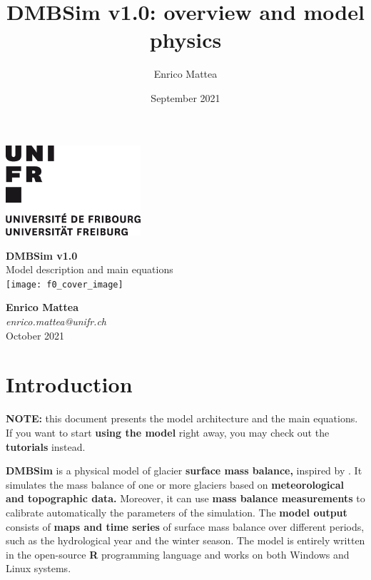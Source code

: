 \documentclass[15pt]{extarticle}
\title{DMBSim v1.0: overview and model physics}
\author{Enrico Mattea}
\date{September 2021}
\begin{document}

\begin{titlepage}
    \includegraphics[width=5cm]{unifr_logo}
    \par
    \vspace{2.0cm}
	\centering
	{\huge\textbf{DMBSim v1.0\\}}
	\vspace{0.3 cm}
	{\large Model description and main equations\\}
	\vspace{1.6 cm}
	\texttt{[image: f0\_cover\_image]}\par
	\vspace{1.45 cm}
	{\normalsize \textbf{Enrico Mattea}\\}
	{\normalsize \textit{enrico.mattea@unifr.ch\\}}
	\vspace{0.6 cm}
	{\normalsize October 2021}
	\vfill

\end{titlepage}


\section{Introduction}
\textbf{NOTE:} this document presents the model architecture and the main equations. If you want to start \textbf{using the model} right away, you may check out the \textbf{tutorials} instead.

\textbf{DMBSim} is a physical model of glacier \textbf{surface mass balance,} inspired by \citet{huss_homogenization_2009}. It simulates the mass balance of one or more glaciers based on \textbf{meteorological and topographic data.} Moreover, it can use \textbf{mass balance measurements} to calibrate automatically the parameters of the simulation. The \textbf{model output} consists of \textbf{maps and time series} of surface mass balance over different periods, such as the hydrological year and the winter season. The model is entirely written in the open-source \textbf{R} programming language and works on both Windows and Linux systems.
\end{document}
